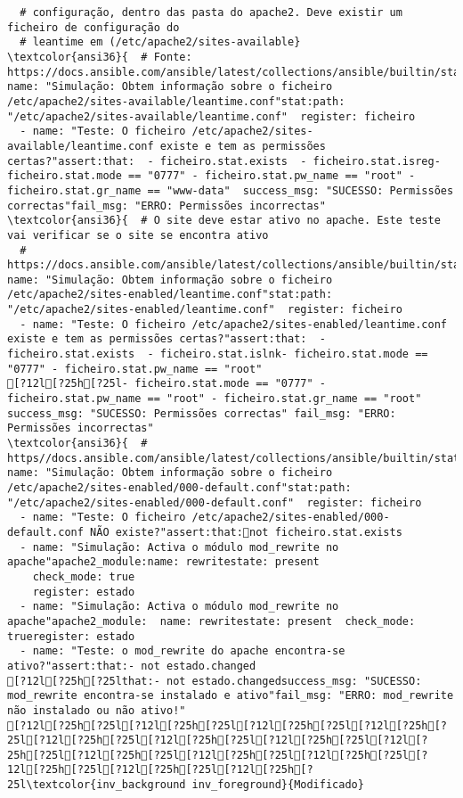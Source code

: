 \documentclass{scrartcl}
\begin{document}
\begin{Verbatim}
  # configuração, dentro das pasta do apache2. Deve existir um ficheiro de configuração do
  # leantime em (/etc/apache2/sites-available}
\textcolor{ansi36}{  # Fonte: https://docs.ansible.com/ansible/latest/collections/ansible/builtin/stat_module.html}- name: "Simulação: Obtem informação sobre o ficheiro /etc/apache2/sites-available/leantime.conf"stat:path: "/etc/apache2/sites-available/leantime.conf"  register: ficheiro
  - name: "Teste: O ficheiro /etc/apache2/sites-available/leantime.conf existe e tem as permissões certas?"assert:that:  - ficheiro.stat.exists  - ficheiro.stat.isreg- ficheiro.stat.mode == "0777" - ficheiro.stat.pw_name == "root" - ficheiro.stat.gr_name == "www-data"  success_msg: "SUCESSO: Permissões correctas"fail_msg: "ERRO: Permissões incorrectas"
\textcolor{ansi36}{  # O site deve estar ativo no apache. Este teste vai verificar se o site se encontra ativo
  # https://docs.ansible.com/ansible/latest/collections/ansible/builtin/stat_module.html}- name: "Simulação: Obtem informação sobre o ficheiro /etc/apache2/sites-enabled/leantime.conf"stat:path: "/etc/apache2/sites-enabled/leantime.conf"  register: ficheiro
  - name: "Teste: O ficheiro /etc/apache2/sites-enabled/leantime.conf existe e tem as permissões certas?"assert:that:  - ficheiro.stat.exists  - ficheiro.stat.islnk- ficheiro.stat.mode == "0777" - ficheiro.stat.pw_name == "root"
[?12l[?25h[?25l- ficheiro.stat.mode == "0777" - ficheiro.stat.pw_name == "root" - ficheiro.stat.gr_name == "root" success_msg: "SUCESSO: Permissões correctas" fail_msg: "ERRO: Permissões incorrectas"
\textcolor{ansi36}{  # https//docs.ansible.com/ansible/latest/collections/ansible/builtin/stat_module.html}- name: "Simulação: Obtem informação sobre o ficheiro /etc/apache2/sites-enabled/000-default.conf"stat:path: "/etc/apache2/sites-enabled/000-default.conf"  register: ficheiro
  - name: "Teste: O ficheiro /etc/apache2/sites-enabled/000-default.conf NÃO existe?"assert:that:not ficheiro.stat.exists
  - name: "Simulação: Activa o módulo mod_rewrite no apache"apache2_module:name: rewritestate: present
    check_mode: true
    register: estado
  - name: "Simulação: Activa o módulo mod_rewrite no apache"apache2_module:  name: rewritestate: present  check_mode: trueregister: estado
  - name: "Teste: o mod_rewrite do apache encontra-se ativo?"assert:that:- not estado.changed
[?12l[?25h[?25lthat:- not estado.changedsuccess_msg: "SUCESSO: mod_rewrite encontra-se instalado e ativo"fail_msg: "ERRO: mod_rewrite não instalado ou não ativo!"
[?12l[?25h[?25l[?12l[?25h[?25l[?12l[?25h[?25l[?12l[?25h[?25l[?12l[?25h[?25l[?12l[?25h[?25l[?12l[?25h[?25l[?12l[?25h[?25l[?12l[?25h[?25l[?12l[?25h[?25l[?12l[?25h[?25l[?12l[?25h[?25l[?12l[?25h[?25l[?12l[?25h[?25l\textcolor{inv_background inv_foreground}{Modificado}

\end{Verbatim}
\end{document}
